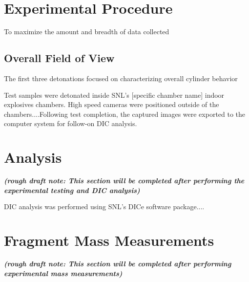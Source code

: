 

\section{Experimental Procedure} \label{sec:experimental_procedure}
To maximize the amount and breadth of data collected


\subsection{Overall Field of View } \label{sec:3_specimen_dimensions}
The first three detonations focused on characterizing overall cylinder behavior 





Test samples were detonated inside \gls{SNL}'s [specific chamber name] indoor explosives chambers. High speed cameras were positioned outside of the chambers....Following test completion, the captured images were exported to the computer system for follow-on \gls{DIC} analysis.
\section{ Analysis} \label{sec:3_digital_image_correlation}
\begin{spacing}{1}
\noindent
\textbf{\textit{(rough draft note: This section will be completed after performing the experimental testing and \gls{DIC} analysis)}}
\end{spacing}
\vspace{1cm}


\gls{DIC} analysis was performed using \gls{SNL}'s DICe software package....


\section{Fragment Mass Measurements}
\label{sec:3_digital_image_correlation}
\begin{spacing}{1}
\noindent
\textbf{\textit{(rough draft note: This section will be completed after performing experimental mass measurements)}}
\end{spacing}
\vspace{1cm}


